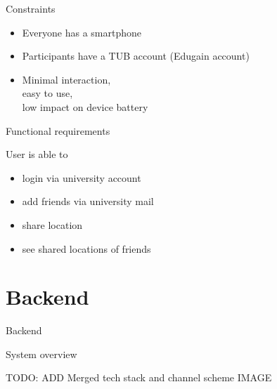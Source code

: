 \documentclass[11pt]{beamer}
\begin{document}
\begin{frame}{Constraints}

  \begin{itemize}

    \item Everyone has a smartphone
  	\item Participants have a TUB account (Edugain account)
  	\item Minimal interaction,\\easy to use,\\low impact on device battery

  \end{itemize}

\end{frame}


\begin{frame}{Functional requirements}

  User is able to

  \vspace{0.25cm}

  \begin{itemize}
    \item login via university account
    \item add friends via university mail
    \item share location
    \item see shared locations of friends
  \end{itemize}

\end{frame}


\section{Backend}

\begin{frame}{}

  \begin{center}

    {\Huge Backend}

  \end{center}

\end{frame}


\begin{frame}{System overview}


  TODO: ADD Merged tech stack and channel scheme IMAGE

\end{frame}
\end{document}
